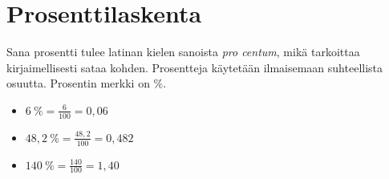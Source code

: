\chapter{Prosenttilaskenta}

Sana prosentti tulee latinan kielen sanoista \emph{pro centum}, mikä tarkoittaa kirjaimellisesti sataa kohden. Prosentteja käytetään ilmaisemaan suhteellista osuutta. Prosentin merkki on \%.



\begin{esimerkki}
\mbox{}
\begin{itemize}
  \item $6~\% = \frac{6}{100} = 0,06$
  \item $48,2~\% = \frac{48,2}{100} = 0,482$
  \item $140~\% = \frac{140}{100} = 1,40$ 
\end{itemize}
\end{esimerkki}




